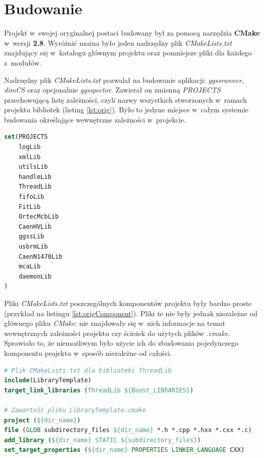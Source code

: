\section{Budowanie} 
Projekt w~swojej oryginalnej postaci budowany był za pomocą narzędzia \textbf{CMake} w~wersji \textbf{2.8}. Wyróżnić można było jeden nadrzędny plik \textit{CMakeLists.txt} znajdujący się w~katalogu głównym projektu oraz pomniejsze pliki dla każdego z~modułów.

Nadrzędny plik \textit{CMakeLists.txt} pozwalał na budowanie aplikacji: \textit{ggssrunner}, \textit{dimCS} oraz opcjonalnie \textit{ggsspector}. Zawierał on zmienną \textit{PROJECTS} przechowującą listę zależności, czyli nazwy wszystkich stworzonych w~ramach projektu bibliotek (listing \ref{lst:orig}). Było to jedyne miejsce w~całym systemie budowania określające wewnętrzne zależności w~projekcie.

\begin{lstlisting}[language=cmake, caption={Fragment oryginalnego pliku \textit{CMakeLists.txt} znajdującego się w~katalogu głównym pierwotnej wersji projektu przedstawiający zmienną \textit{PROJECTS} zawierającą listę bibliotek \cite{PluteckiMgr}}, label={lst:orig}]
set(PROJECTS
    logLib
    xmlLib
    utilsLib
    handleLib
    ThreadLib
    fifoLib
    FitLib
    OrtecMcbLib
    CaenHVLib
    ggssLib
    usbrmLib
    CaenN1470Lib
    mcaLib
    daemonLib
)
\end{lstlisting}

Pliki \textit{CMakeLists.txt} poszczególnych komponentów projektu były bardzo proste (przykład na listingu \ref{lst:origComponent}). Pliki te nie były jednak niezależne od głównego pliku \textit{CMake}: nie znajdowały się w~nich informacje na temat wewnętrznych zależności projektu czy ścieżek do użytych plików \textit{.cmake}. Sprawiało to, że niemożliwym było użycie ich do zbudowania pojedynczego komponentu projektu w~sposób niezależne od całości. 

\begin{lstlisting}[language=cmake, caption={Oryginalny pliku \textit{CMakeLists.txt} służący do budowania biblioteki \textit{ThreadLib} oraz zawartość pliku \textit{LibraryTemplate.cmake} \cite{PluteckiMgr}}, label={lst:origComponent}]
# Plik CMakeLists.txt dla biblioteki ThreadLib
include(LibraryTemplate)
target_link_libraries (ThreadLib ${Boost_LIBRARIES})

# Zawartość pliku LibraryTemplate.cmake
project (${dir_name})
file (GLOB subdirectory_files ${dir_name} *.h *.cpp *.hxx *.cxx *.c)
add_library (${dir_name} STATIC ${subdirectory_files})
set_target_properties (${dir_name} PROPERTIES LINKER_LANGUAGE CXX)
\end{lstlisting}

